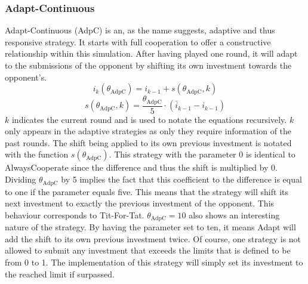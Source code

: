 \documentclass{article}
\begin{document}
\subsubsection*{Adapt-Continuous}
Adapt-Continuous (AdpC) is an, as the name suggests, adaptive and thus responsive strategy.
It starts with full cooperation to offer a constructive relationship within this simulation.
After having played one round, it will adapt to the submissions of the opponent by shifting its own investment towards the opponent's.
$$i_k(\theta_{\mathrm{AdpC}}) = i_{k-1} + s(\theta_{\mathrm{AdpC}}, k)$$
$$s(\theta_{\mathrm{AdpC}}, k) = \frac{\theta_{\mathrm{AdpC}}}{5} \cdot (\bar i_{k-1} - i_{k-1})$$
$k$ indicates the current round and is used to notate the equations recursively.
$k$ only appears in the adaptive strategies as only they require information of the past rounds.
The shift being applied to its own previous investment is notated with the function $s(\theta_{\mathrm{AdpC}})$.
This strategy with the parameter 0 is identical to AlwaysCooperate since the difference and thus the shift is multiplied by 0.
Dividing $\theta_{\mathrm{AdpC}}$ by 5 implies the fact that this coefficient to the difference is equal to one if the parameter equals five.
This means that the strategy will shift its next investment to exactly the previous investment of the opponent.
This behaviour corresponds to Tit-For-Tat.
$\theta_{\mathrm{AdpC}} = 10$ also shows an interesting nature of the strategy.
By having the parameter set to ten, it means Adapt will add the shift to its own previous investment twice.
Of course, one strategy is not allowed to submit any investment that exceeds the limits that is defined to be from 0 to 1.
The implementation of this strategy will simply set its investment to the reached limit if surpassed.\\
\end{document}
